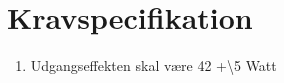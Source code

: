 \chapter{Kravspecifikation}

\begin{enumerate}
\item Udgangseffekten skal være 42 +\backslash 5 Watt
\end{enumerate}